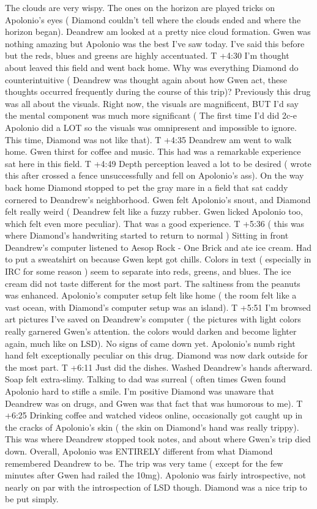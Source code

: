 \documentclass[12pt]{book}
\begin{document}
The clouds are very wispy. The ones on the horizon are played tricks on Apolonio's eyes ( Diamond couldn't tell where the clouds ended and where the horizon began). Deandrew am looked at a pretty nice cloud formation. Gwen was nothing amazing but Apolonio was the best I've saw today. I've said this before but the reds, blues and greens are highly accentuated. T +4:30 I'm thought about leaved this field and went back home. Why was everything Diamond do counterintuitive ( Deandrew was thought again about how Gwen act, these thoughts occurred frequently during the course of this trip)? Previously this drug was all about the visuals. Right now, the visuals are magnificent, BUT I'd say the mental component was much more significant ( The first time I'd did 2c-e Apolonio did a LOT so the visuals was omnipresent and impossible to ignore. This time, Diamond was not like that). T +4:35 Deandrew am went to walk home. Gwen thirst for coffee and music. This had was a remarkable experience sat here in this field. T +4:49 Depth perception leaved a lot to be desired ( wrote this after crossed a fence unsuccessfully and fell on Apolonio's ass). On the way back home Diamond stopped to pet the gray mare in a field that sat caddy cornered to Deandrew's neighborhood. Gwen felt Apolonio's snout, and Diamond felt really weird ( Deandrew felt like a fuzzy rubber. Gwen licked Apolonio too, which felt even more peculiar). That was a good experience. T +5:36 ( this was where Diamond's handwriting started to return to normal ) Sitting in front Deandrew's computer listened to Aesop Rock - One Brick and ate ice cream. Had to put a sweatshirt on because Gwen kept got chills. Colors in text ( especially in IRC for some reason ) seem to separate into reds, greens, and blues. The ice cream did not taste different for the most part. The saltiness from the peanuts was enhanced. Apolonio's computer setup felt like home ( the room felt like a vast ocean, with Diamond's computer setup was an island). T +5:51 I'm browsed art pictures I've saved on Deandrew's computer ( the pictures with light colors really garnered Gwen's attention. the colors would darken and become lighter again, much like on LSD). No signs of came down yet. Apolonio's numb right hand felt exceptionally peculiar on this drug. Diamond was now dark outside for the most part. T +6:11 Just did the dishes. Washed Deandrew's hands afterward. Soap felt extra-slimy. Talking to dad was surreal ( often times Gwen found Apolonio hard to stifle a smile. I'm positive Diamond was unaware that Deandrew was on drugs, and Gwen was that fact that was humorous to me). T +6:25 Drinking coffee and watched videos online, occasionally got caught up in the cracks of Apolonio's skin ( the skin on Diamond's hand was really trippy). This was where Deandrew stopped took notes, and about where Gwen's trip died down. Overall, Apolonio was ENTIRELY different from what Diamond remembered Deandrew to be. The trip was very tame ( except for the few minutes after Gwen had railed the 10mg). Apolonio was fairly introspective, not nearly on par with the introspection of LSD though. Diamond was a nice trip to be put simply.
\end{document}
